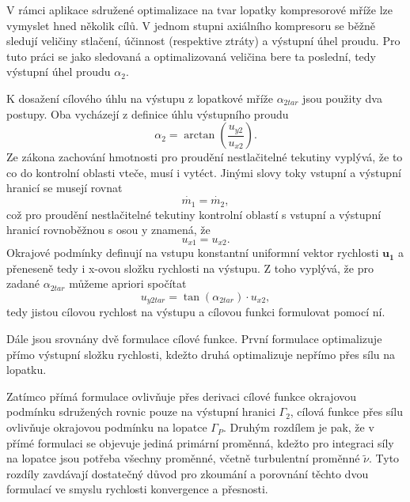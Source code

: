 V rámci aplikace sdružené optimalizace na tvar lopatky kompresorové mříže lze vymyslet hned několik cílů. V jednom stupni axiálního kompresoru se běžně sledují veličiny stlačení, účinnost (respektive ztráty) a výstupní úhel proudu. Pro tuto práci se jako sledovaná a optimalizovaná veličina bere ta poslední, tedy výstupní úhel proudu $ \alpha_2 $. 

K dosažení cílového úhlu na výstupu z lopatkové mříže $ \alpha_{2tar} $ jsou použity dva postupy. Oba vycházejí z definice úhlu výstupního proudu
\begin{equation}\label{eq:alpha_tan}
\alpha_2 = \arctan\left(\dfrac{u_{y2}}{u_{x2}}\right).
\end{equation}
Ze zákona zachování hmotnosti pro proudění nestlačitelné tekutiny vyplývá, že to co do kontrolní oblasti vteče, musí i vytéct. Jinými slovy toky vstupní a výstupní hranicí se musejí rovnat
\begin{equation}
\dot{m_1}=\dot{m_2},
\end{equation}
což pro proudění nestlačitelné tekutiny kontrolní oblastí s vstupní a výstupní hranicí rovnoběžnou s osou y znamená, že 
\begin{equation}\label{eq:ux1_ux2}
u_{x1}=u_{x2}.
\end{equation}
Okrajové podmínky definují na vstupu konstantní uniformní vektor rychlosti $ \mathbf{u_1} $ a přeneseně tedy i x-ovou složku rychlosti na výstupu. Z toho vyplývá, že pro zadané $ \alpha_{2tar} $ můžeme apriori spočítat
\begin{equation}
u_{y2tar} = \tan(\alpha_{2tar}) \cdot u_{x2},
\end{equation}
tedy jistou cílovou rychlost na výstupu a cílovou funkci formulovat pomocí ní.

Dále jsou srovnány dvě formulace cílové funkce. První formulace optimalizuje přímo výstupní složku rychlosti, kdežto druhá optimalizuje nepřímo přes sílu na lopatku.

Zatímco přímá formulace ovlivňuje přes derivaci cílové funkce okrajovou podmínku sdružených rovnic pouze na výstupní hranici $ \Gamma_2 $, cílová funkce přes sílu ovlivňuje okrajovou podmínku na lopatce $ \Gamma_P $. Druhým rozdílem je pak, že v přímé formulaci se objevuje jediná primární proměnná, kdežto pro integraci síly na lopatce jsou potřeba všechny proměnné, včetně turbulentní proměnné $ \widetilde{\nu} $. Tyto rozdíly zavdávají dostatečný důvod pro zkoumání a porovnání těchto dvou formulací ve smyslu rychlosti konvergence a přesnosti.

